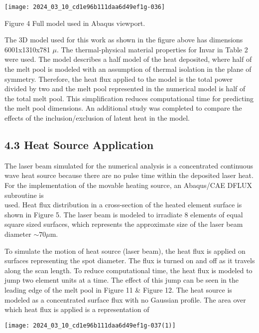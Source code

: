 \documentclass[10pt]{article}
\begin{document}
\begin{center}
\texttt{[image: 2024\_03\_10\_cd1e96b111daa6d49ef1g-036]}
\end{center}

Figure 4 Full model used in Abaqus viewport.

The 3D model used for this work as shown in the figure above has dimensions 6001x1310x781 $\mu$. The thermal-physical material properties for Invar in Table 2 were used. The model describes a half model of the heat deposited, where half of the melt pool is modeled with an assumption of thermal isolation in the plane of symmetry. Therefore, the heat flux applied to the model is the total power divided by two and the melt pool represented in the numerical model is half of the total melt pool. This simplification reduces computational time for predicting the melt pool dimensions. An additional study was completed to compare the effects of the inclusion/exclusion of latent heat in the model.

\subsection*{4.3 Heat Source Application}
The laser beam simulated for the numerical analysis is a concentrated continuous wave heat source because there are no pulse time within the deposited laser heat. For the implementation of the movable heating source, an Abaqus/CAE DFLUX subroutine is\\
used. Heat flux distribution in a cross-section of the heated element surface is shown in Figure 5. The laser beam is modeled to irradiate 8 elements of equal square sized surfaces, which represents the approximate size of the laser beam diameter $\sim 70 \mu \mathrm{m}$.

To simulate the motion of heat source (laser beam), the heat flux is applied on surfaces representing the spot diameter. The flux is turned on and off as it travels along the scan length. To reduce computational time, the heat flux is modeled to jump two element units at a time. The effect of this jump can be seen in the leading edge of the melt pool in Figure 11 \& Figure 12. The heat source is modeled as a concentrated surface flux with no Gaussian profile. The area over which heat flux is applied is a representation of

\begin{center}
\texttt{[image: 2024\_03\_10\_cd1e96b111daa6d49ef1g-037(1)]}
\end{center}
\end{document}
